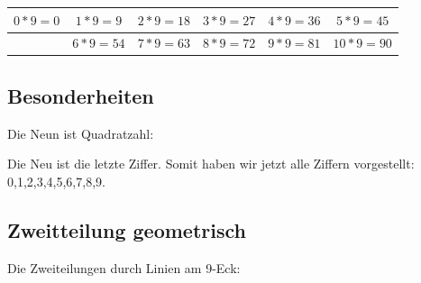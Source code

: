\documentclass[a4paper]{amsart}
\theoremstyle{definition}
\begin{document}
\begin{tabular}{|c|c|c|c|c|c|}
   \hline
   $0 * 9 = 0$ & $1 * 9 = 9$ & $2 * 9 = 18$ & $3 * 9 = 27$ & $4 * 9 = 36$ & $5 * 9 = 45$\\ 
   \hline
   & $6 * 9 = 54$ & $7 * 9 = 63$ & $8 * 9 = 72$ & $9 * 9 = 81$ & $10 * 9 = 90$ \\
   \hline
\end{tabular}

\subsection{Besonderheiten}
Die Neun ist Quadratzahl:


Die Neu ist die letzte Ziffer. Somit haben wir jetzt alle Ziffern vorgestellt: 0,1,2,3,4,5,6,7,8,9.



\subsection{Zweitteilung geometrisch}
Die Zweiteilungen durch Linien am 9-Eck:

\vspace{\kategoryVspace}
\end{document}
